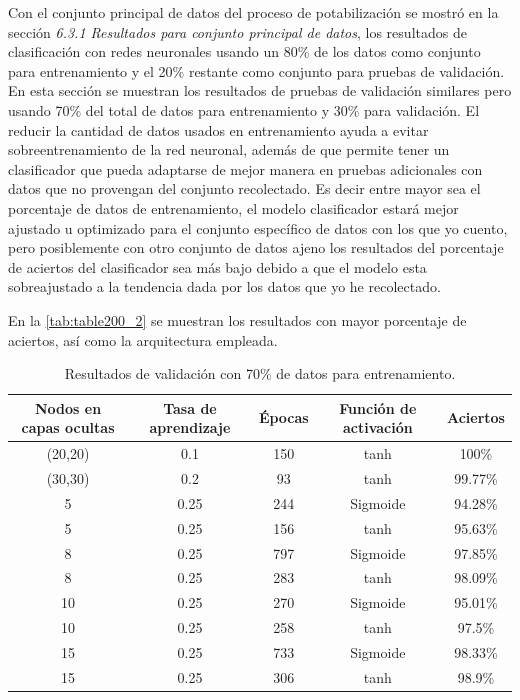 Con el conjunto principal de datos del proceso de potabilización se mostró en la sección \textit{6.3.1 Resultados para conjunto principal de datos}, los resultados de clasificación con redes neuronales usando un 80$\%$ de 
los datos como conjunto para entrenamiento y el 20$\%$ restante como conjunto para pruebas de validación. En esta sección se muestran los resultados de pruebas de validación similares pero usando 70$\%$ del total de datos 
para entrenamiento y 30$\%$ para validación. El reducir la cantidad de datos usados en entrenamiento ayuda a evitar sobreentrenamiento de la red neuronal, además de que permite tener un clasificador que pueda adaptarse de 
mejor manera en pruebas adicionales con datos que no provengan del conjunto recolectado. Es decir entre mayor sea el porcentaje de datos de entrenamiento, el modelo clasificador estará mejor ajustado u optimizado para el 
conjunto específico de datos con los que yo cuento, pero posiblemente con otro conjunto de datos ajeno los resultados del porcentaje de aciertos del clasificador sea más bajo debido a que el modelo esta sobreajustado a la 
tendencia dada por los datos que yo he recolectado.

En la \autoref{tab:table200_2} se muestran los resultados con mayor porcentaje de aciertos, así como la arquitectura empleada.

\begin{table}[h]
	\begin{center}
		\begin{tabular}{| c | c | c | c | c |}
	    	\hline
            Nodos en capas ocultas & Tasa de aprendizaje & Épocas & Función de activación & Aciertos \\ \hline
			(20,20) & 0.1 & 150 & tanh & 100\% \\
			(30,30) & 0.2 & 93 & tanh & 99.77\% \\
			5 & 0.25 & 244 & Sigmoide & 94.28\% \\
			5 & 0.25 & 156 & tanh & 95.63\% \\
			8 & 0.25 & 797 & Sigmoide & 97.85\% \\
			8 & 0.25 & 283 & tanh & 98.09\% \\
			10 & 0.25 & 270 & Sigmoide & 95.01\% \\
			10 & 0.25 & 258 & tanh & 97.5\% \\
			15 & 0.25 & 733 & Sigmoide & 98.33\% \\
			15 & 0.25 & 306 & tanh & 98.9\% \\ \hline
	    \end{tabular}	
		\caption{Resultados de validación con 70$\%$ de datos para entrenamiento.}
        \label{tab:table200_2}	
	\end{center}
\end{table}

